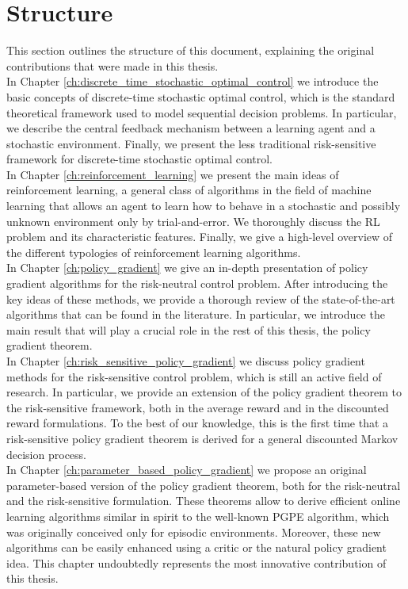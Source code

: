 \section{Structure}
This section outlines the structure of this document, explaining the original contributions that were made in this thesis.\\
In Chapter \ref{ch:discrete_time_stochastic_optimal_control} we introduce the basic concepts of discrete-time stochastic optimal control, which is the standard theoretical framework used to model sequential decision problems. In particular, we describe the central feedback mechanism between a learning agent and a stochastic environment. Finally, we present the less traditional risk-sensitive framework for discrete-time stochastic optimal control.\\
In Chapter \ref{ch:reinforcement_learning} we present the main ideas of reinforcement learning, a general class of algorithms in the field of machine learning that allows an agent to learn how to behave in a stochastic and possibly unknown environment only by trial-and-error. We thoroughly discuss the \gls{RL} problem and its characteristic features. Finally, we give a high-level overview of the different typologies of reinforcement learning algorithms.\\ 
In Chapter \ref{ch:policy_gradient} we give an in-depth presentation of policy gradient algorithms for the risk-neutral control problem. After introducing the key ideas of these methods, we provide a thorough review of the state-of-the-art algorithms that can be found in the literature. In particular, we introduce the main result that will play a crucial role in the rest of this thesis, the policy gradient theorem.\\
In Chapter \ref{ch:risk_sensitive_policy_gradient} we discuss policy gradient methods for the risk-sensitive control problem, which is still an active field of research. In particular, we provide an extension of the policy gradient theorem to the risk-sensitive framework, both in the average reward and in the discounted reward formulations. To the best of our knowledge, this is the first time that a risk-sensitive policy gradient theorem is derived for a general discounted Markov decision process.\\
In Chapter \ref{ch:parameter_based_policy_gradient} we propose an original parameter-based version of the policy gradient theorem, both for the risk-neutral and the risk-sensitive formulation. These theorems allow to derive efficient online learning algorithms similar in spirit to the well-known \gls{PGPE} algorithm, which was originally conceived only for episodic environments. Moreover, these new algorithms can be easily enhanced using a critic or the natural policy gradient idea. This chapter undoubtedly represents the most innovative contribution of this thesis.\\ 
